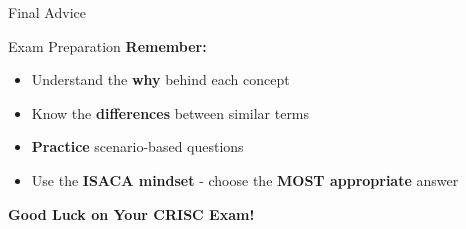 \documentclass{beamer}
\begin{document}
	\begin{frame}{Final Advice}
		\begin{block}{Exam Preparation}
			\centering
			\vspace{0.3cm}
			\textbf{Remember:}
			\begin{itemize}
				\item Understand the \textbf{why} behind each concept
				\item Know the \textbf{differences} between similar terms
				\item \textbf{Practice} scenario-based questions
				\item Use the \textbf{ISACA mindset} - choose the \textbf{MOST appropriate} answer
			\end{itemize}
			\vspace{0.5cm}
			\Large{\textbf{Good Luck on Your CRISC Exam!}}
		\end{block}
	\end{frame}
	
	
\end{document}
